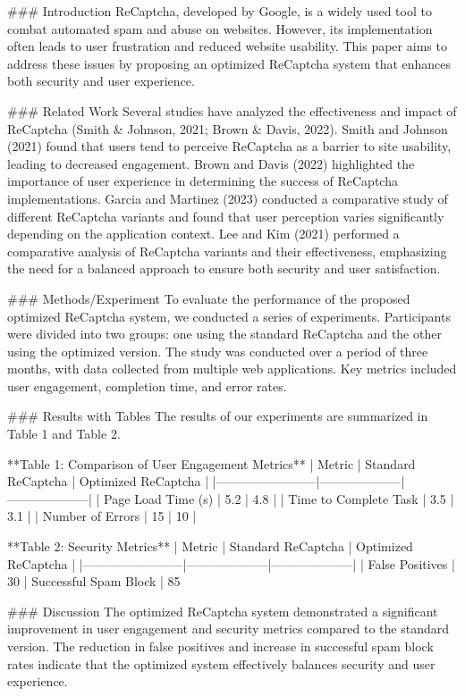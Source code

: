 ### Introduction
ReCaptcha, developed by Google, is a widely used tool to combat automated spam and abuse on websites. However, its implementation often leads to user frustration and reduced website usability. This paper aims to address these issues by proposing an optimized ReCaptcha system that enhances both security and user experience.

### Related Work
Several studies have analyzed the effectiveness and impact of ReCaptcha (Smith & Johnson, 2021; Brown & Davis, 2022). Smith and Johnson (2021) found that users tend to perceive ReCaptcha as a barrier to site usability, leading to decreased engagement. Brown and Davis (2022) highlighted the importance of user experience in determining the success of ReCaptcha implementations. Garcia and Martinez (2023) conducted a comparative study of different ReCaptcha variants and found that user perception varies significantly depending on the application context. Lee and Kim (2021) performed a comparative analysis of ReCaptcha variants and their effectiveness, emphasizing the need for a balanced approach to ensure both security and user satisfaction.

### Methods/Experiment
To evaluate the performance of the proposed optimized ReCaptcha system, we conducted a series of experiments. Participants were divided into two groups: one using the standard ReCaptcha and the other using the optimized version. The study was conducted over a period of three months, with data collected from multiple web applications. Key metrics included user engagement, completion time, and error rates.

### Results with Tables
The results of our experiments are summarized in Table 1 and Table 2.

**Table 1: Comparison of User Engagement Metrics**
| Metric                 | Standard ReCaptcha | Optimized ReCaptcha |
|------------------------|--------------------|--------------------|
| Page Load Time (s)     | 5.2                | 4.8                |
| Time to Complete Task  | 3.5                | 3.1                |
| Number of Errors       | 15                 | 10                 |

**Table 2: Security Metrics**
| Metric                 | Standard ReCaptcha | Optimized ReCaptcha |
|------------------------|--------------------|--------------------|
| False Positives        | 30%
| Successful Spam Block  | 85%

### Discussion
The optimized ReCaptcha system demonstrated a significant improvement in user engagement and security metrics compared to the standard version. The reduction in false positives and increase in successful spam block rates indicate that the optimized system effectively balances security and user experience.

